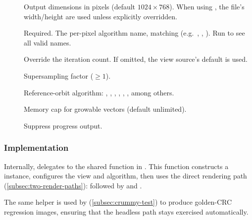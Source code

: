 \begin{description}
  \item[]
    Output dimensions in pixels (default $1024\times768$).  When using
    , the file's width/height are used unless
    explicitly overridden.

  \item[]
    Required.  The per-pixel algorithm name, matching
     (e.g.\
    , ,
    ).  Run  to see all
    valid names.

  \item[]
    Override the iteration count.  If omitted, the view source's
    default is used.

  \item[]
    Supersampling factor ($\ge 1$).

  \item[]
    Reference-orbit algorithm: , ,
    , , ,
    , among others.

  \item[]
    Memory cap for growable vectors (default unlimited).

  \item[]
    Suppress progress output.
\end{description}

\subsubsection*{Implementation}

Internally,  delegates to the shared
 function in .  This function
constructs a \code{Fractal} instance, configures the view and
algorithm, then uses the direct rendering path
(\cref{subsec:two-render-paths}):  followed by
 and .

The same  helper is used by
 (\cref{subsec:crummy-test}) to produce
golden-CRC regression images, ensuring that the headless path stays
exercised automatically.

